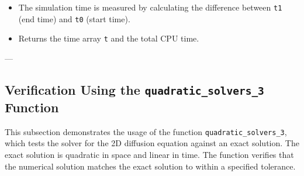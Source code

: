 \documentclass{article}
\begin{document}
		\noindent
		
		\begin{itemize}
			\item The simulation time is measured by calculating the difference between \texttt{t1} (end time) and \texttt{t0} (start time).
			\item Returns the time array \texttt{t} and the total CPU time.
		\end{itemize}
		
		---

	
	\subsection{Verification Using the \texttt{quadratic\_solvers\_3} Function}
	
		This subsection demonstrates the usage of the function \texttt{quadratic\_solvers\_3}, which tests the solver for the 2D diffusion equation against an exact solution. The exact solution is quadratic in space and linear in time. The function verifies that the numerical solution matches the exact solution to within a specified tolerance.
		
\end{document}
